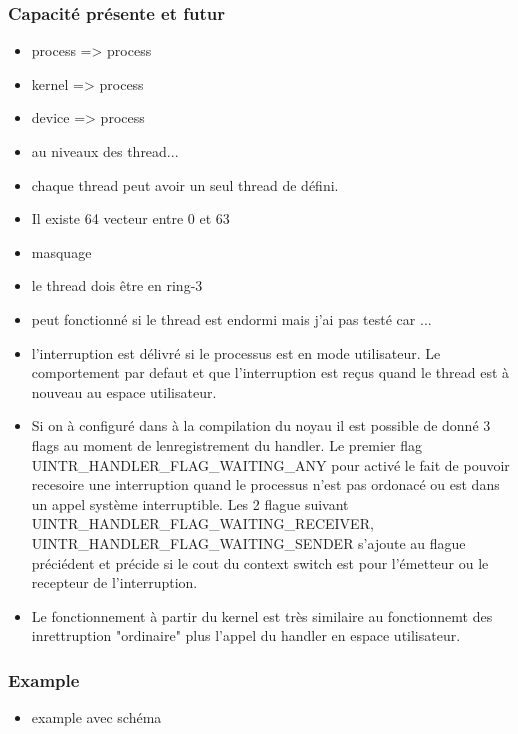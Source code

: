 
\subsubsection{Capacité présente et futur}

\begin{itemize}
  \item process => process
  \item kernel => process
  \item device => process
  \item au niveaux des thread...
  \item chaque thread peut avoir un seul thread de défini.
  \item Il existe 64 vecteur entre 0 et 63
  \item masquage
  \item le thread dois être en ring-3
  \item peut fonctionné si le thread est endormi mais j'ai pas testé car ...
  \item l'interruption est délivré si le processus est en mode utilisateur. Le comportement par defaut et que l'interruption est reçus quand le thread est à nouveau au espace utilisateur.
  \item Si on à configuré dans à la compilation du noyau il est possible de donné 3 flags au moment de lenregistrement du handler. Le premier flag UINTR_HANDLER_FLAG_WAITING_ANY pour activé le fait de pouvoir recesoire une interruption quand le processus n'est pas ordonacé ou est dans un appel système interruptible. Les 2 flague suivant UINTR_HANDLER_FLAG_WAITING_RECEIVER, UINTR_HANDLER_FLAG_WAITING_SENDER s'ajoute au flague préciédent et précide si le cout du context switch est pour l'émetteur ou le recepteur de l'interruption.
  \item Le fonctionnement à partir du kernel est très similaire au fonctionnemt des inrettruption "ordinaire" plus l'appel du handler en espace utilisateur.
\end{itemize}

\subsubsection{Example}

\begin{itemize}
  \item example avec schéma
\end{itemize}

